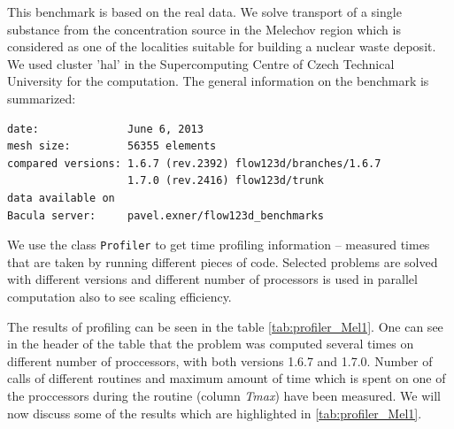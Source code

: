 This benchmark is based on the real data. We solve transport of a single 
substance from the concentration source in the Melechov region which is considered as
one of the localities suitable for building a nuclear waste deposit.
We used cluster 'hal' in the Supercomputing Centre of Czech Technical University for the computation.
The general information on the benchmark is summarized:

\begin{verbatim}
date:              June 6, 2013 
mesh size:         56355 elements
compared versions: 1.6.7 (rev.2392) flow123d/branches/1.6.7 
                   1.7.0 (rev.2416) flow123d/trunk 
data available on 
Bacula server:     pavel.exner/flow123d_benchmarks
\end{verbatim}

We use the class \verb'Profiler' to get time profiling information -- measured times that are taken by running different 
pieces of code. Selected problems are solved with different versions and different number 
of processors is used in parallel computation also to see scaling efficiency.


The results of profiling can be seen in the table \ref{tab:profiler_Mel1}. One can see in the header 
of the table that the problem was computed several times on different number of proccessors, with both 
versions 1.6.7 and 1.7.0. Number of calls of different routines and maximum amount of time which is 
spent on one of the proccessors during the routine (column \emph{Tmax}) have been measured.
We will now discuss some of the results which are highlighted in \ref{tab:profiler_Mel1}.


